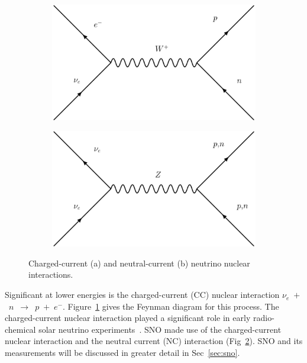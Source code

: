 \begin{figure}[htbp]
\centering
\begin{subfigure}[b]{0.48\textwidth}
    \centering
    \includegraphics[width=\textwidth]{cc_nuc}
\caption[]{}
\label{fig:nuclear_cc}
\end{subfigure}
\hfill
\begin{subfigure}[b]{0.48\textwidth}
    \centering
    \includegraphics[width=\textwidth]{nc_nuc}
\caption[]{}
\label{fig:nuclear_nc}
\end{subfigure}
  \caption[Neutrino Nuclear Interactions]{Charged-current (a) and neutral-current (b)
  neutrino nuclear interactions.}
\label{fig:nuclear_interactions}
\end{figure}

Significant at lower energies is the charged-current (CC) nuclear interaction
$\nu_{e}$~$+$~$n$~$\rightarrow$~$p$~$+$~$e^{-}$.
Figure~\ref{fig:nuclear_cc} gives the Feynman diagram for this process.
The charged-current nuclear interaction played a significant role in early
radio-chemical solar neutrino experiments~\citep{homestake, sage, gallex, gno}.
SNO made use of the charged-current nuclear interaction and the neutral
current (NC) interaction (Fig~\ref{fig:nuclear_nc}).
SNO and its measurements will be discussed in greater detail in Sec~\ref{sec:sno}.

